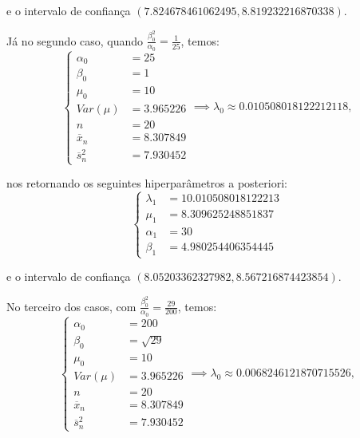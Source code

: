 \documentclass{article}
\begin{document}
\noindent e o intervalo de confiança $(7.824678461062495, 8.819232216870338)$.

Já no segundo caso, quando $\frac{\beta_0^2}{\alpha_0}  =\frac{1}{25}$, temos:
\begin{equation*}
    \left\{
        \begin{array}{ll}
            \alpha_0 & = 25 \\
            \beta_0 & = 1 \\
            \mu_0 & = 10 \\
            Var(\mu) & = 3.965226 \\
            n & = 20 \\
            \overline{x}_n & = 8.307849 \\
            \overline{s}_n^2 & = 7.930452
        \end{array}
    \right.
    \implies \lambda_0 \approx 0.010508018122212118,
\end{equation*}

\noindent nos retornando os seguintes hiperparâmetros a posteriori:
\begin{equation*}
    \left\{
        \begin{array}{ll}
            \lambda_1 & = 10.010508018122213 \\
            \mu_1 & = 8.309625248851837 \\
            \alpha_1 & = 30 \\
            \beta_1 & = 4.980254406354445
        \end{array}
    \right.
\end{equation*}

\noindent e o intervalo de confiança $(8.05203362327982, 8.567216874423854)$.

No terceiro dos casos, com $\frac{\beta_0^2}{\alpha_0} = \frac{29}{200}$, temos:
\begin{equation*}
    \left\{
        \begin{array}{ll}
            \alpha_0 & = 200 \\
            \beta_0 & = \sqrt{29} \\
            \mu_0 & = 10 \\
            Var(\mu) & = 3.965226 \\
            n & = 20 \\
            \overline{x}_n & = 8.307849 \\
            \overline{s}_n^2 & = 7.930452
        \end{array}
    \right.
    \implies \lambda_0 \approx 0.0068246121870715526,
\end{equation*}
\end{document}
